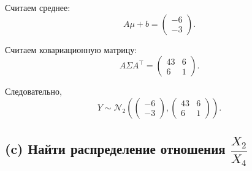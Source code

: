 \documentclass[12pt]{article}
\begin{document}
    Считаем среднее:
    \[
        A\mu + b
        =
        \begin{pmatrix}
            -6\\
            -3
        \end{pmatrix}.
    \]

    Считаем ковариационную матрицу:
    \[
        A\Sigma A^\top
        =
        \begin{pmatrix}
            43 & 6\\
            6 & 1
        \end{pmatrix}.
    \]

    Следовательно,
    \[
        Y \sim \mathcal{N}_2\!\left(
                                  \begin{pmatrix}
                                      -6\\
                                      -3
                                  \end{pmatrix},
                                  \begin{pmatrix}
                                      43 & 6\\
                                      6 & 1
                                  \end{pmatrix}
        \right).
    \]

    \subsection*{(c) Найти распределение отношения $\dfrac{X_2}{X_4}$}
\end{document}
